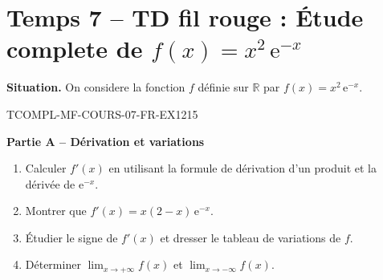 

\section*{Temps 7 -- TD fil rouge : Étude complete de $f(x) = x^2\,\mathrm{e}^{-x}$}

\textbf{Situation.} On considere la fonction $f$ définie sur $\mathbb{R}$ par $f(x) = x^2\,\mathrm{e}^{-x}$.

\bigskip


\begin{exercice}{TCOMPL-MF-COURS-07-FR-EX1}{2}{15}

\textbf{Partie A -- Dérivation et variations}

\begin{enumerate}
  \item Calculer $f'(x)$ en utilisant la formule de dérivation d'un produit et la dérivée de $\mathrm{e}^{-x}$.
  \item Montrer que $f'(x) = x(2-x)\,\mathrm{e}^{-x}$.
  \item Étudier le signe de $f'(x)$ et dresser le tableau de variations de $f$.
  \item Déterminer $\lim_{x \to +\infty} f(x)$ et $\lim_{x \to -\infty} f(x)$.
\end{enumerate}

\end{exercice}

